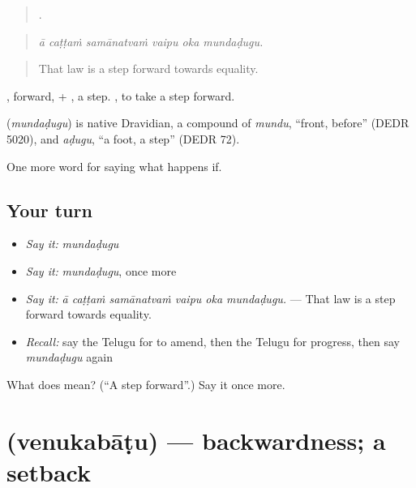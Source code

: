 \begin{quote}
     .
\end{quote}

\begin{quote}
\emph{ā caṭṭaṁ samānatvaṁ vaipu oka mundaḍugu.}
\end{quote}

\begin{quote}
That law is a step forward towards equality.
\end{quote}

, forward, + , a step.  , to take a step forward.

\begin{cousinweb}
\textbf{} (\emph{mundaḍugu}) is native Dravidian, a compound of \emph{mundu}, \textquotedblleft{}front, before\textquotedblright{} (DEDR 5020), and \emph{aḍugu}, \textquotedblleft{}a foot, a step\textquotedblright{} (DEDR 72).
\end{cousinweb}

\begin{grammarlens}[title={What you've built}]
One more word for saying what happens if.
\end{grammarlens}

\subsection*{Your turn}
\begin{itemize}
\raggedright
  \item \emph{Say it:} \emph{mundaḍugu}
  \item \emph{Say it:} \emph{mundaḍugu}, once more
  \item \emph{Say it:} \emph{ā caṭṭaṁ samānatvaṁ vaipu oka mundaḍugu.} — That law is a step forward towards equality.
  \item \emph{Recall:} say the Telugu for to amend, then the Telugu for progress, then say \emph{mundaḍugu} again
\end{itemize}

\begin{tcolorbox}[breakable,colback=teal!4,colframe=teal!35!black,title={Before you move on}]
What does  mean? (\textquotedblleft{}A step forward\textquotedblright{}.) Say it once more.
\end{tcolorbox}
\section[\texorpdfstring{\te{వెనుకబాటు} (venukabāṭu)}{వెనుకబాటు (venukabāṭu)}]{ (venukabāṭu) — backwardness; a setback}

